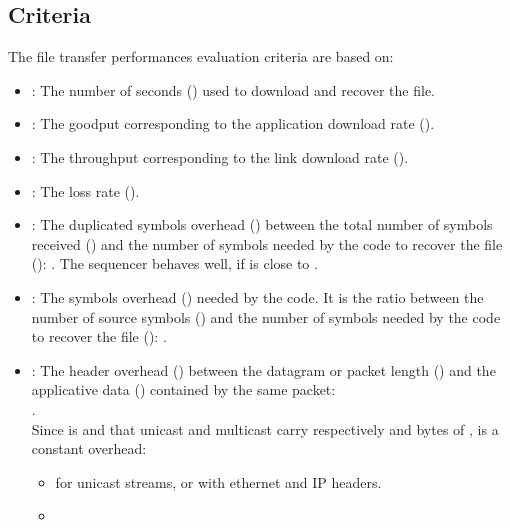 \documentclass[a4paper]{article}
\begin{document}
     \subsection{Criteria}
        The file transfer performances evaluation criteria are based on:
\begin{itemize}
            \item{
                : The number of seconds () used to download and recover
                    the file.
            }
            \item{
                : The goodput corresponding to the application download
                    rate ().
            }
            \item{
                : The throughput corresponding to the link download rate
                    ().
            }
            \item{
                : The loss rate ().
            }
            \item{
                : The duplicated symbols overhead () between the total
                    number of  symbols received () and
                    the number of symbols needed by the  code to recover
                    the file (): .  The sequencer behaves
                                                well, if  is close to .
            }
            \item{
                : The  symbols overhead () needed by the 
                    code. It is the ratio between the number of source
                    symbols () and the number of symbols needed
                    by the  code to recover the file ():
                        .
            }
            \item{
                : The header overhead () between
                    the datagram or packet length () and the
                    applicative data () contained by the same
                    packet:
                    \\
                    .
                    \\
                    Since  is  and that unicast
                    and multicast carry respectively  and  bytes of
                    ,  is a constant overhead:
                    \begin{itemize}
                        \item{
                             for unicast streams, or  with
                                ethernet and IP headers.
                        }
                        \item{
}
\end{itemize}}
\end{itemize}
\end{document}
